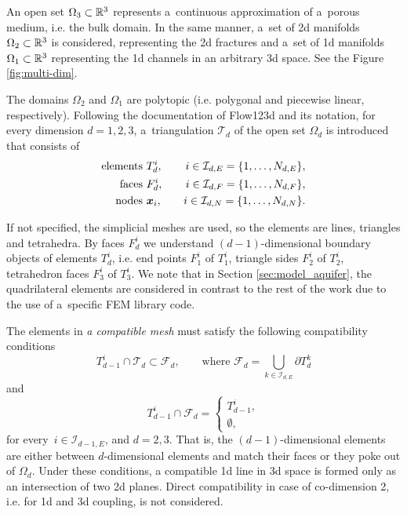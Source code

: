 An open set $\Omega_{3} \subset {\mathbb{R}}^3$ represents a~continuous approximation of a~porous medium, i.e. the bulk domain.
In the same manner, a~set of 2d manifolds $\Omega_2 \subset {\mathbb{R}}^3$ is considered, representing the 2d fractures
and a~set of 1d manifolds $\Omega_1 \subset {\mathbb{R}}^3$ representing the 1d channels in an arbitrary 3d space.
See the Figure \ref{fig:multi-dim}.


The domains $\Omega_2$ and $\Omega_1$ are polytopic (i.e. polygonal and piecewise linear, respectively).
Following the documentation of Flow123d \cite{flow123d_doc_2015} and its notation,
for every dimension $d=1,2,3$, a~triangulation $\mathcal{T}_{d}$ of the open set $\Omega_d$
is introduced that consists of
\begin{equation}
\begin{aligned}
    \textrm{elements } & T_{d}^{i}, & \quad i \in\mathcal{I}_{d,E} = \{1,\dots,N_{d,E} \}, \\
    \textrm{faces }    & F_{d}^{i}, & \quad i \in\mathcal{I}_{d,F} = \{1,\dots,N_{d,F} \}, \\
    \textrm{nodes }    & \mathbf{\boldsymbol{x}}_{i}, & \quad i \in\mathcal{I}_{d,N} = \{1,\dots,N_{d,N} \}.
\end{aligned}
\end{equation}

If not specified, the simplicial meshes are used, so the elements are lines, triangles and tetrahedra.
By faces $F^i_d$ we understand $(d-1)$-dimensional boundary objects of elements $T_d^i$,
i.e. end points $F^i_1$ of $T^i_1$, triangle sides $F^i_2$ of $T^i_2$, tetrahedron faces $F^i_3$ of $T^i_3$.
We note that in Section \ref{sec:model_aquifer}, the quadrilateral elements are considered in contrast to the rest of the work
due to the use of a~specific FEM library code.


The elements in \emph{a compatible mesh} must satisfy the following compatibility conditions
\begin{equation}
        T_{d-1}^i \cap \mathcal{T}_d \subset \mathcal{F}_d,  \qquad \text{where } \mathcal{F}_d = \bigcup_{k\in\mathcal{I}_{d,E}} \partial T_{d}^{k}
\end{equation}
and
\begin{equation}
        T_{d-1}^i \cap \mathcal{F}_d = 
        \begin{cases}
            T_{d-1}^i, \\
            \emptyset,
        \end{cases}
\end{equation}
for every $\,i\in\mathcal{I}_{d-1,E}$, and $d=2,3$. 
That is, the $(d-1)$-dimensional elements are either between $d$-dimensional elements and
match their faces or they poke out of $\Omega_d$. 
Under these conditions, a compatible 1d line in 3d space is formed only as an intersection of 
two 2d planes.
Direct compatibility in case of co-dimension 2, i.e. for 1d and 3d coupling, is not considered.


